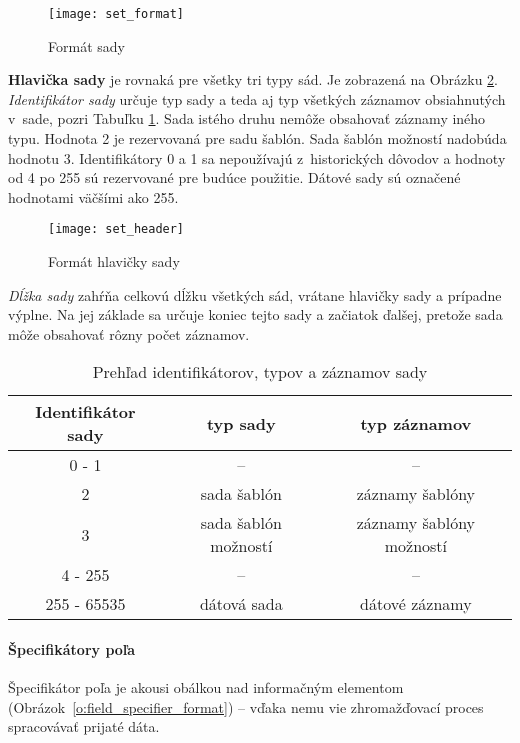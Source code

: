 \begin{figure}[ht!]
\centering
\texttt{[image: set\_format]}
\caption{Formát sady}\label{o:set_format}
\end{figure}

\textbf{Hlavička sady} je rovnaká pre všetky tri typy sád. Je zobrazená na Obrázku \ref{o:set_header}. 
\emph{Identifikátor sady} určuje typ sady a teda aj typ všetkých záznamov obsiahnutých v~sade, pozri 
Tabuľku \ref{t:set-record}. 
Sada istého druhu nemôže obsahovať záznamy iného typu. 
Hodnota 2 je rezervovaná pre sadu šablón. Sada šablón možností nadobúda 
hodnotu 3. Identifikátory 0 a 1 sa nepoužívajú z~historických dôvodov \citep{rfc3954} a hodnoty od 4 po 
255 sú rezervované pre budúce použitie. Dátové sady sú označené hodnotami väčšími ako 255. 


\begin{figure}[ht!]
\centering
\texttt{[image: set\_header]}
\caption{Formát hlavičky sady}\label{o:set_header}
\end{figure}

\emph{Dĺžka sady} zahŕňa celkovú dĺžku všetkých sád, vrátane hlavičky sady a prípadne výplne. Na jej základe 
sa určuje koniec tejto sady a začiatok ďalšej, pretože sada môže obsahovať rôzny počet záznamov.

\tabcolsep=8pt
\begin{table}[!ht]\caption{Prehľad identifikátorov, typov a záznamov sady}\label{t:set-record}
\smallskip
\centering
\begin{tabular}{|c|c|c|}
\hline
\textbf{Identifikátor sady} & \textbf{typ sady} & \textbf{typ záznamov} \\ \hline
0 - 1 & -- & -- \\ \hline
2 & sada šablón & záznamy šablóny \\ \hline
3 & sada šablón možností & záznamy šablóny možností \\ \hline
4 - 255 & -- & -- \\ \hline
255 - 65535 & dátová sada & dátové záznamy \\ \hline
\end{tabular}
\end{table}


\paragraph{Špecifikátory poľa}

Špecifikátor poľa je akousi obálkou nad informačným elementom (Obrázok~\ref{o:field_specifier_format}) -- 
vďaka nemu vie zhromažďovací proces spracovávať prijaté dáta. 

